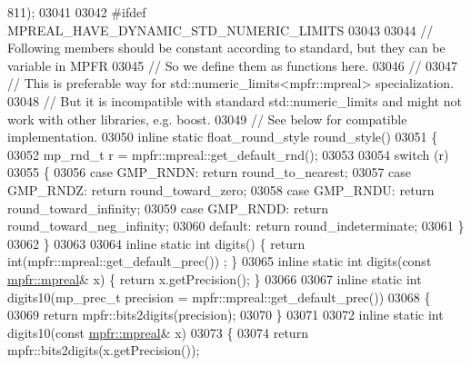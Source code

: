 \begin{DoxyCode}
{{{      811);
03041 
03042 \textcolor{preprocessor}{#ifdef MPREAL\_HAVE\_DYNAMIC\_STD\_NUMERIC\_LIMITS}
03043 
03044         \textcolor{comment}{// Following members should be constant according to standard, but they can be variable in MPFR}
03045         \textcolor{comment}{// So we define them as functions here.}
03046         \textcolor{comment}{//}
03047         \textcolor{comment}{// This is preferable way for std::numeric\_limits<mpfr::mpreal> specialization.}
03048         \textcolor{comment}{// But it is incompatible with standard std::numeric\_limits and might not work with other
       libraries, e.g. boost.}
03049         \textcolor{comment}{// See below for compatible implementation.}
03050         \textcolor{keyword}{inline} \textcolor{keyword}{static} float\_round\_style round\_style()
03051         \{
03052             mp\_rnd\_t r = mpfr::mpreal::get\_default\_rnd();
03053 
03054             \textcolor{keywordflow}{switch} (r)
03055             \{
03056             \textcolor{keywordflow}{case} GMP\_RNDN: \textcolor{keywordflow}{return} round\_to\_nearest;
03057             \textcolor{keywordflow}{case} GMP\_RNDZ: \textcolor{keywordflow}{return} round\_toward\_zero;
03058             \textcolor{keywordflow}{case} GMP\_RNDU: \textcolor{keywordflow}{return} round\_toward\_infinity;
03059             \textcolor{keywordflow}{case} GMP\_RNDD: \textcolor{keywordflow}{return} round\_toward\_neg\_infinity;
03060             \textcolor{keywordflow}{default}: \textcolor{keywordflow}{return} round\_indeterminate;
03061             \}
03062         \}
03063 
03064         \textcolor{keyword}{inline} \textcolor{keyword}{static} \textcolor{keywordtype}{int} digits()                        \{    \textcolor{keywordflow}{return} int(mpfr::mpreal::get\_default\_prec())
      ;    \}
03065         \textcolor{keyword}{inline} \textcolor{keyword}{static} \textcolor{keywordtype}{int} digits(\textcolor{keyword}{const} \hyperlink{classmpfr_1_1mpreal}{mpfr::mpreal}& x)   \{    \textcolor{keywordflow}{return} x.getPrecision();        
                       \}
03066 
03067         \textcolor{keyword}{inline} \textcolor{keyword}{static} \textcolor{keywordtype}{int} digits10(mp\_prec\_t precision = mpfr::mpreal::get\_default\_prec())
03068         \{
03069             \textcolor{keywordflow}{return} mpfr::bits2digits(precision);
03070         \}
03071 
03072         \textcolor{keyword}{inline} \textcolor{keyword}{static} \textcolor{keywordtype}{int} digits10(\textcolor{keyword}{const} \hyperlink{classmpfr_1_1mpreal}{mpfr::mpreal}& x)
03073         \{
03074             \textcolor{keywordflow}{return} mpfr::bits2digits(x.getPrecision());
}}}
\end{DoxyCode}
